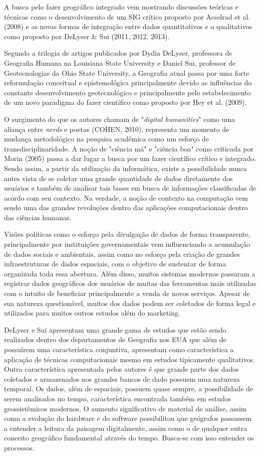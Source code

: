 A busca pelo fazer geográfico integrado vem mostrando discussões teóricas e técnicas como o desenvolvimento de um SIG crítico proposto por Acselrad et al. (2008) e as novas formas de integração entre dados quantitativos e o qualitativos como proposto por DeLyser \& Sui (2011, 2012, 2013).

Segundo a trilogia de artigos publicados por Dydia DeLyser, professora de Geografia Humana na Louisiana State University e Daniel Sui, professor de Geotecnologias da Ohio State University, a Geografia atual passa por uma forte reformulação conceitual e epistemológica principalmente devido as influências do constante desenvolvimento geotecnológico e principalmente pelo estabelecimento de um novo paradigma do fazer científico como proposto por Hey et al. (2009).

O surgimento do que os autores chamam de "\textit{digital humanities}" como uma aliança entre \textit{nerds} e poetas (COHEN, 2010), representa um momento de mudança metodológico na pesquisa acadêmica como um esforço de transdisciplinaridade. A noção de "ciência má" e "ciência boa" como criticada por Morin (2005) passa a dar lugar a busca por um fazer científico crítico e integrado. Sendo assim, a partir da utilização da informática, existe a possibilidade nunca antes vista de se coletar uma grande quantidade de dados diretamente dos usuários e também de analisar tais bases em busca de informações classificadas de acordo com seu contexto. Na verdade, a noção de contexto na computação vem sendo uma das grandes revoluções dentro das aplicações computacionais dentro das ciências humanas.

Visões políticas como o esforço pela divulgação de dados de forma transparente, principalmente por instituições governamentais vem influenciando a acumulação de dados sociais e ambientais, assim como no esforço pela criação de grandes infraestruturas de dados espaciais, com o objetivo de sustentar de forma organizada toda essa abertura. Além disso, muitos sistemas modernos passaram a registrar dados geográficos dos usuários de muitas das ferramentas mais utilizadas com o intuito de beneficiar principalmente a venda de novos serviços. Apesar de sua natureza questionável, muitos dos dados podem ser coletados de forma legal e utilizados para muitos outros estudos além do marketing.  

DeLyser e Sui apresentam uma grande gama de estudos que estão sendo realizados dentro dos departamentos de Geografia nos EUA que além de possuírem uma característica conjuntiva, apresentam como característica a aplicação de técnicas computacionais mesmo em estudos tipicamente qualitativos. Outra característica apresentada pelos autores é que grande parte dos dados coletados e armazenados nos grandes bancos de dado possuem uma natureza temporal. Os dados, além de espaciais, possuem quase sempre, a possibilidade de serem analisados no tempo, característica encontrada também em estudos geossistêmicos modernos. O aumento significativo de material de análise, assim como a evolução do hardware e do software possibilitou que geógrafos passassem a entender a leitura da paisagem digitalmente, assim como o de qualquer outra conceito geográfico fundamental através do tempo. Busca-se com isso entender os processos.

